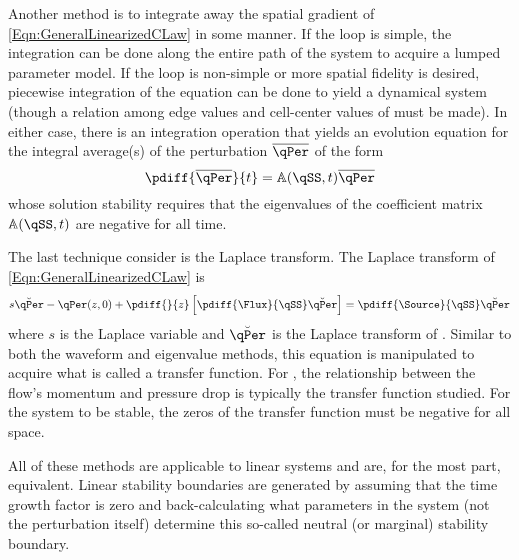 Another method is to integrate away the spatial gradient of \cref{Eqn:GeneralLinearizedCLaw} in some manner.
If the loop is simple, the integration can be done along the entire path of the system to acquire a lumped parameter model.
If the loop is non-simple or more spatial fidelity is desired, piecewise integration of the equation can be done to yield a dynamical system (though a relation among edge values and cell-center values of \qPer must be made).
In either case, there is an integration operation that yields an evolution equation for the integral average(s) of the perturbation $\overline{\qPer}$ of the form
\begin{equation}
    \pdiff{\overline{\qPer}}{t} = \mathbb{A}(\qSS,t)\overline{\qPer}
    \label{Eqn:EigenvalueStability}
\end{equation}
whose solution stability requires that the eigenvalues of the coefficient matrix $\mathbb{A}(\qSS,t)$ are negative for all time.

The last technique consider is the Laplace transform.
The Laplace transform of \cref{Eqn:GeneralLinearizedCLaw} is 
\begin{equation}
    s \breve{\qPer} - \qPer(z,0) + \pdiff{}{z}\left[\pdiff{\Flux}{\qSS}\breve{\qPer} \right] = \pdiff{\Source}{\qSS}\breve{\qPer} 
    \label{Eqn:LaplaceTransform}
\end{equation}
where $s$ is the Laplace variable and $\breve{\qPer}$ is the Laplace transform of \qPer.
Similar to both the waveform and eigenvalue methods, this equation is manipulated to acquire what is called a transfer function.
For \TH, the relationship between the flow's momentum and pressure drop is typically the transfer function studied.
For the system to be stable, the zeros of the transfer function must be negative for all space.

All of these methods are applicable to linear systems and are, for the most part, equivalent.
Linear stability boundaries are generated by assuming that the time growth factor is zero and back-calculating what parameters in the system (not the perturbation itself) determine this so-called neutral (or marginal) stability boundary.




